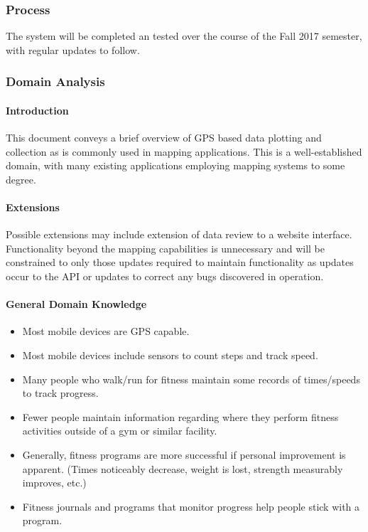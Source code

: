 \documentclass{article}
\begin{document}
\subsubsection{Process}
The system will be completed an tested over the course of the Fall 2017 semester, with regular updates to follow.

\subsubsection{Domain Analysis}
\paragraph{Introduction}
This document conveys a brief overview of GPS based data plotting and collection as is commonly used in mapping applications. This is a well-established domain, with many existing applications employing mapping systems to some degree.

\paragraph{Extensions}
Possible extensions may include extension of data review to a website interface. Functionality beyond the mapping capabilities is unnecessary and will be constrained to only those updates required to maintain functionality as updates occur to the API or updates to correct any bugs discovered in operation.

\paragraph{General Domain Knowledge}
\begin{itemize}
    \item  Most mobile devices are GPS capable.
    \item Most mobile devices include sensors to count steps and track speed.
    \item Many people who walk/run for fitness maintain some records of times/speeds to track progress.
    \item Fewer people maintain information regarding where they perform fitness activities outside of a gym or similar facility.
    \item Generally, fitness programs are more successful if personal improvement is apparent. (Times noticeably decrease, weight is lost, strength measurably improves, etc.)
    \item Fitness journals and programs that monitor progress help people stick with a program.
\end{itemize}
\end{document}
